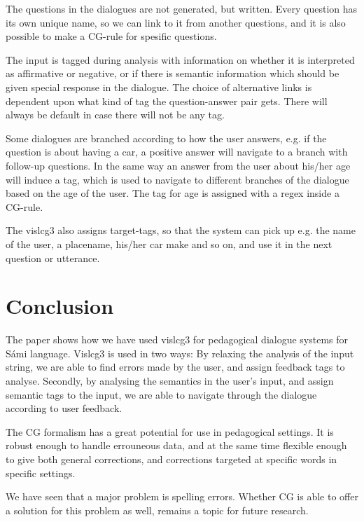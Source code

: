 \documentclass[11pt]{article}
\begin{document}
The questions in the dialogues are not generated, but written. Every question has its own unique name, so we can link to it from another questions, and it is also possible to make a CG-rule for spesific questions.   

The input is tagged during analysis with information on whether it is interpreted as affirmative or negative, or if there is semantic information which should be given special response in the dialogue. The choice of alternative links is dependent upon what kind of tag the question-answer pair gets. There will always be default in case there will not be any tag. 
 
Some dialogues are branched according to how the user answers, e.g. if the question is about having a car, a positive answer will navigate to a branch with follow-up questions. In the same way an answer from the user about his/her age will induce a tag, which is used to navigate to different branches of the dialogue based on the age of the user. The tag for age is assigned with a regex inside a CG-rule.

The vislcg3 also assigns target-tags, so that the system can pick up e.g. the name of the user, a placename, his/her car make and so on, and use it in the next question or utterance.
 
\section{Conclusion}
The paper shows how we have used vislcg3 for pedagogical dialogue systems for Sámi language. Vislcg3 is used in two ways: By relaxing the analysis of the input string, we are able to find errors made by the user, and assign feedback tags to analyse. Secondly, by analysing the semantics in the user's input, and assign semantic tags to the input, we are able to navigate through the dialogue according to user feedback.  

The CG formalism has a great potential for use in pedagogical settings.
It is robust enough to handle errouneous data, and at the same time flexible enough to give both general corrections, and corrections targeted at specific words in specific settings.

We have seen that a major problem is spelling errors. Whether CG is able to offer a solution for this problem as well, remains a topic for future research.
\end{document}
